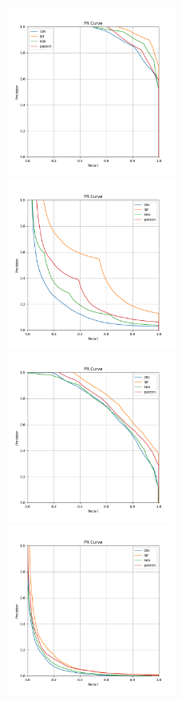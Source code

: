 \begin{figure}[!ht]
    \includegraphics[width=0.5\textwidth]{../images/toyexperiments/prcurves/PRCurve_k4_s1.png} 
    \includegraphics[width=0.5\textwidth]{../images/toyexperiments/prcurves/PRCurve_k4_s3.png}
    \includegraphics[width=0.5\textwidth]{../images/toyexperiments/prcurves/PRCurve_ksqrt_s1.png} 
    \includegraphics[width=0.5\textwidth]{../images/toyexperiments/prcurves/PRCurve_ksqrt_s3.png} 
\end{figure}


